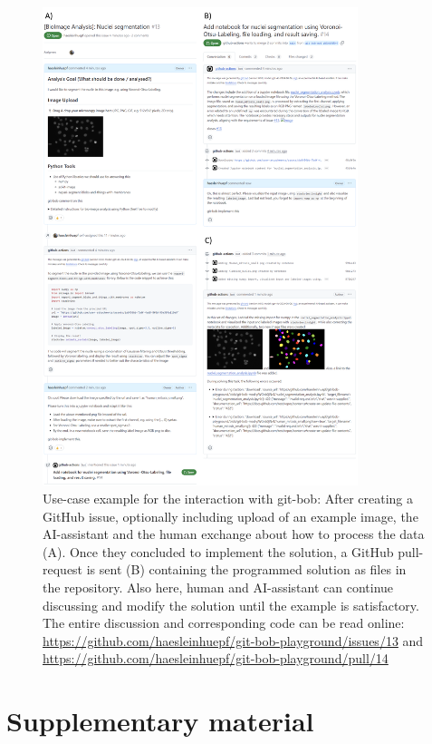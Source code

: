 \documentclass{ecai}
\begin{document}
\begin{figure}[h]
\centering
\includegraphics[width=0.82\textwidth]{example_interaction.png}
\caption{Use-case example for the interaction with git-bob: After creating a GitHub issue, optionally including upload of an example image, the AI-assistant and the human exchange about how to process the data (A). Once they concluded to implement the solution, a GitHub pull-request is sent (B) containing the programmed solution as files in the repository. Also here, human and AI-assistant can continue discussing and modify the solution until the example is satisfactory.  The entire discussion and corresponding code can be read online: \url{https://github.com/haesleinhuepf/git-bob-playground/issues/13} and \url{https://github.com/haesleinhuepf/git-bob-playground/pull/14}
\newline
\newline
}
\label{fig:example_interaction}
\end{figure}

\section{Supplementary material}
\setcounter{figure}{0} 
\renewcommand{\thefigure}{S\arabic{figure}}
\end{document}
